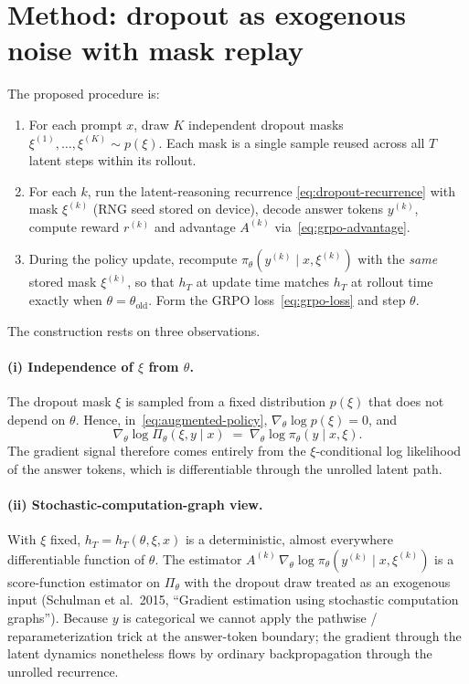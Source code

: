 \documentclass[11pt]{article}
\theoremstyle{definition}
\theoremstyle{remark}
\newcommand{\old}{\mathrm{old}}
\begin{document}
\section{Method: dropout as exogenous noise with mask replay}
\label{sec:method}

The proposed procedure is:
\begin{enumerate}[topsep=2pt,itemsep=2pt]
\item For each prompt $x$, draw $K$ independent dropout masks
      $\xi^{(1)}, \dots, \xi^{(K)} \sim p(\xi)$.  Each mask is a single
      sample reused across all $T$ latent steps within its rollout.
\item For each $k$, run the latent-reasoning recurrence
      \eqref{eq:dropout-recurrence} with mask $\xi^{(k)}$ (RNG seed stored
      on device), decode answer tokens $y^{(k)}$, compute reward
      $r^{(k)}$ and advantage $A^{(k)}$ via~\eqref{eq:grpo-advantage}.
\item During the policy update, recompute
      $\pi_\theta(y^{(k)}\mid x,\xi^{(k)})$ with the \emph{same} stored
      mask $\xi^{(k)}$, so that $h_T$ at update time matches $h_T$ at
      rollout time exactly when $\theta = \theta_\old$.  Form the GRPO
      loss~\eqref{eq:grpo-loss} and step $\theta$.
\end{enumerate}

The construction rests on three observations.

\paragraph{(i) Independence of $\xi$ from $\theta$.}
The dropout mask $\xi$ is sampled from a fixed distribution $p(\xi)$ that
does not depend on $\theta$.  Hence, in~\eqref{eq:augmented-policy},
$\nabla_\theta \log p(\xi) = 0$, and
\begin{equation}
\nabla_\theta \log \Pi_\theta(\xi, y \mid x)
  \;=\;
\nabla_\theta \log \pi_\theta(y \mid x, \xi).
\label{eq:score-reduces}
\end{equation}
The gradient signal therefore comes entirely from the $\xi$-conditional log
likelihood of the answer tokens, which is differentiable through the
unrolled latent path.

\paragraph{(ii) Stochastic-computation-graph view.}
With $\xi$ fixed, $h_T = h_T(\theta, \xi, x)$ is a deterministic, almost
everywhere differentiable function of $\theta$.  The estimator
$A^{(k)}\,\nabla_\theta \log \pi_\theta(y^{(k)}\mid x,\xi^{(k)})$ is a
score-function estimator on $\Pi_\theta$ with the dropout draw treated as
an exogenous input (Schulman et al.\ 2015, ``Gradient estimation using
stochastic computation graphs'').  Because $y$ is categorical we cannot
apply the pathwise / reparameterization trick at the answer-token boundary;
the gradient through the latent dynamics nonetheless flows by ordinary
backpropagation through the unrolled recurrence.
\end{document}
